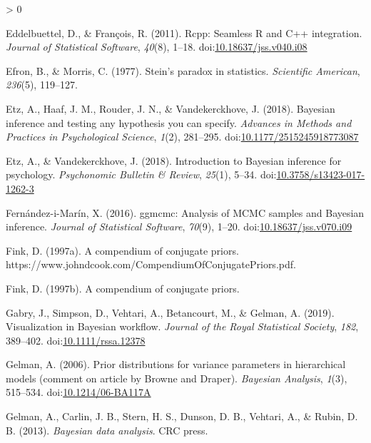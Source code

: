 \documentclass[
  english,
  doc,floatsintext]{apa6}
\newlength{\cslhangindent}
\newenvironment{CSLReferences}[2] %
 {%
  \setlength{\parindent}{0pt}
  \ifodd #1 \everypar{\setlength{\hangindent}{\cslhangindent}}\ignorespaces\fi
  \ifnum #2 > 0
  \setlength{\parskip}{#2\baselineskip}
  \fi
 }%
 {}
\begin{document}
\begin{CSLReferences}{1}{0}
\leavevmode\hypertarget{ref-R-Rcpp_a}{}%
Eddelbuettel, D., \& François, R. (2011). {Rcpp}: Seamless {R} and {C++} integration. \emph{Journal of Statistical Software}, \emph{40}(8), 1--18. doi:\href{https://doi.org/10.18637/jss.v040.i08}{10.18637/jss.v040.i08}

\leavevmode\hypertarget{ref-efron1977stein}{}%
Efron, B., \& Morris, C. (1977). Stein's paradox in statistics. \emph{Scientific American}, \emph{236}(5), 119--127.

\leavevmode\hypertarget{ref-etz2018bayesian}{}%
Etz, A., Haaf, J. M., Rouder, J. N., \& Vandekerckhove, J. (2018). Bayesian inference and testing any hypothesis you can specify. \emph{Advances in Methods and Practices in Psychological Science}, \emph{1}(2), 281--295. doi:\href{https://doi.org/10.1177/2515245918773087}{10.1177/2515245918773087}

\leavevmode\hypertarget{ref-etz2018introduction}{}%
Etz, A., \& Vandekerckhove, J. (2018). Introduction to {Bayesian} inference for psychology. \emph{Psychonomic Bulletin \& Review}, \emph{25}(1), 5--34. doi:\href{https://doi.org/10.3758/s13423-017-1262-3}{10.3758/s13423-017-1262-3}

\leavevmode\hypertarget{ref-R-ggmcmc}{}%
Fernández-i-Marín, X. (2016). {ggmcmc}: Analysis of {MCMC} samples and {B}ayesian inference. \emph{Journal of Statistical Software}, \emph{70}(9), 1--20. doi:\href{https://doi.org/10.18637/jss.v070.i09}{10.18637/jss.v070.i09}

\leavevmode\hypertarget{ref-Fink1997}{}%
Fink, D. (1997a). A compendium of conjugate priors. https://www.johndcook.com/CompendiumOfConjugatePriors.pdf.

\leavevmode\hypertarget{ref-fink1997compendium}{}%
Fink, D. (1997b). A compendium of conjugate priors.

\leavevmode\hypertarget{ref-R-bayesplot}{}%
Gabry, J., Simpson, D., Vehtari, A., Betancourt, M., \& Gelman, A. (2019). Visualization in {Bayesian} workflow. \emph{Journal of the Royal Statistical Society}, \emph{182}, 389--402. doi:\href{https://doi.org/10.1111/rssa.12378}{10.1111/rssa.12378}

\leavevmode\hypertarget{ref-gelman2006prior}{}%
Gelman, A. (2006). Prior distributions for variance parameters in hierarchical models (comment on article by {Browne} and {Draper}). \emph{Bayesian Analysis}, \emph{1}(3), 515--534. doi:\href{https://doi.org/10.1214/06-BA117A}{10.1214/06-BA117A}

\leavevmode\hypertarget{ref-gelman2013bayesian}{}%
Gelman, A., Carlin, J. B., Stern, H. S., Dunson, D. B., Vehtari, A., \& Rubin, D. B. (2013). \emph{Bayesian data analysis}. CRC press.


\end{CSLReferences}
\end{document}
